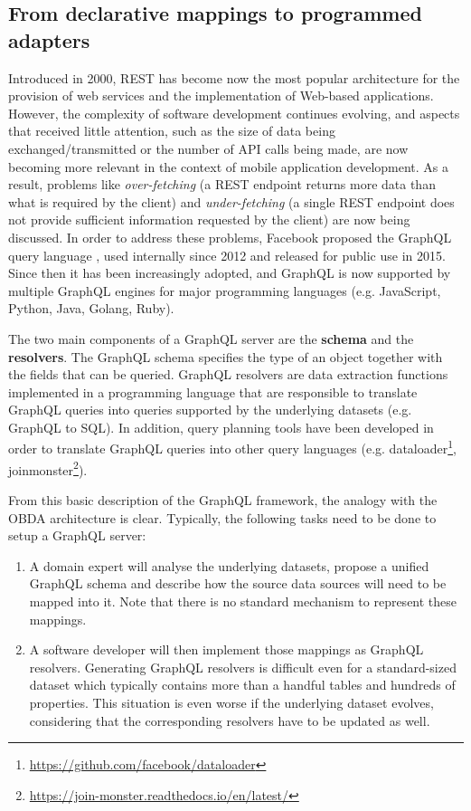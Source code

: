 \subsection{From declarative mappings to programmed adapters}
Introduced in 2000, REST \citep{fielding2000architectural} has become now the most popular architecture for the provision of web services and the implementation of Web-based applications. However, the complexity of software development continues evolving, and aspects that received little attention, such as the size of data being exchanged/transmitted or the number of API calls being made, are now becoming more relevant in the context of mobile application development. As a result, problems like \textit{over-fetching} (a REST endpoint returns more data than what is required by the client) and \textit{under-fetching} (a single REST endpoint does not provide sufficient information requested by the client) are now being discussed. In order to address these problems, Facebook proposed the GraphQL query language \citep{graphql}, used internally since 2012 and released for public use in 2015. Since then it has been increasingly adopted, and GraphQL is now supported by multiple GraphQL engines for major programming languages (e.g. JavaScript, Python, Java, Golang, Ruby).

The two main components of a GraphQL server are the \textbf{schema} and the \textbf{resolvers}. The GraphQL schema specifies the type of an object together with the fields that can be queried. GraphQL resolvers are data extraction functions implemented in a programming language that are responsible to translate GraphQL queries into queries supported by the underlying datasets (e.g. GraphQL to SQL). In addition, query planning tools have been developed in order to translate GraphQL queries into other query languages (e.g. dataloader\footnote{\url{https://github.com/facebook/dataloader}}, joinmonster\footnote{\url{https://join-monster.readthedocs.io/en/latest/}}).

From this basic description of the GraphQL framework, the analogy with the OBDA architecture is clear. Typically, the following tasks need to be done to setup a GraphQL server: 
\begin{enumerate}
    \item A domain expert will analyse the underlying datasets, propose a unified GraphQL schema and describe how the source data sources will need to be mapped into it. Note that there is no standard mechanism to represent these mappings.
    \item A software developer will then implement those mappings as GraphQL resolvers.
    Generating GraphQL resolvers is difficult even for a standard-sized dataset which typically contains more than a handful tables and hundreds of properties. This situation is even worse if the underlying dataset evolves, considering that the corresponding resolvers have to be updated as well.
\end{enumerate}

